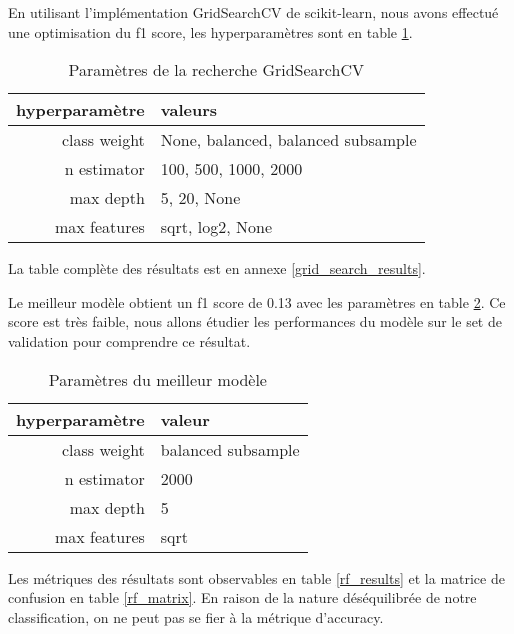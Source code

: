 En utilisant l'implémentation GridSearchCV de scikit-learn, nous avons effectué une optimisation du f1 score, les hyperparamètres sont en table \ref{grid_params}.

\begin{table}[H]
    \begin{center}
        \caption{\label{grid_params}Paramètres de la recherche GridSearchCV}
        \begin{tabular}{r|l}
            hyperparamètre & valeurs                            \\ \hline
            class weight   & None, balanced, balanced subsample \\
            n estimator    & 100, 500, 1000, 2000               \\
            max depth      & 5, 20, None                        \\
            max features   & sqrt, log2, None                   \\
        \end{tabular}
    \end{center}
\end{table}

La table complète des résultats est en annexe \ref{grid_search_results}.

Le meilleur modèle obtient un f1 score de 0.13 avec les paramètres en table \ref{rf_params}.
Ce score est très faible, nous allons étudier les performances du modèle sur le set de validation pour comprendre ce résultat.

\begin{table}[H]
    \begin{center}
        \caption{\label{rf_params}Paramètres du meilleur modèle}
        \begin{tabular}{r|l}
            hyperparamètre & valeur             \\ \hline
            class weight   & balanced subsample \\
            n estimator    & 2000               \\
            max depth      & 5                  \\
            max features   & sqrt               \\
        \end{tabular}
    \end{center}
\end{table}

Les métriques des résultats sont observables en table \ref{rf_results} et la matrice de confusion en table \ref{rf_matrix}.
En raison de la nature déséquilibrée de notre classification, on ne peut pas se fier à la métrique d'accuracy.

